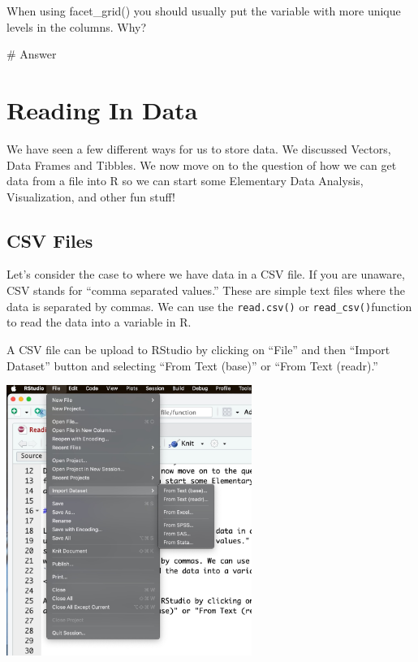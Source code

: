 \documentclass[
  letterpaper,
  DIV=11,
  numbers=noendperiod]{scrreprt}
\newenvironment{Shaded}{\begin{snugshade}}{\end{snugshade}}
\newcommand{\CommentTok}[1]{\textcolor[rgb]{0.37,0.37,0.37}{#1}}
\begin{document}

When using facet\_grid() you should usually put the variable with more
unique levels in the columns. Why?

\begin{Shaded}
\begin{Highlighting}[]
\CommentTok{\# Answer}
\end{Highlighting}
\end{Shaded}


\chapter*{Reading In Data}\label{reading-in-data}


We have seen a few different ways for us to store data. We discussed
Vectors, Data Frames and Tibbles. We now move on to the question of how
we can get data from a file into R so we can start some Elementary Data
Analysis, Visualization, and other fun stuff!

\section*{CSV Files}\label{csv-files}


Let's consider the case to where we have data in a CSV file. If you are
unaware, CSV stands for ``comma separated values.'' These are simple
text files where the data is separated by commas. We can use the
\texttt{read.csv()} or \texttt{read\_csv()}function to read the data
into a variable in R.

A CSV file can be upload to RStudio by clicking on ``File'' and then
``Import Dataset'' button and selecting ``From Text (base)'' or ``From
Text (readr).''

\includegraphics[width=0.6\textwidth,height=\textheight]{./images/Read-In-Data-1.jpg}
\end{document}
